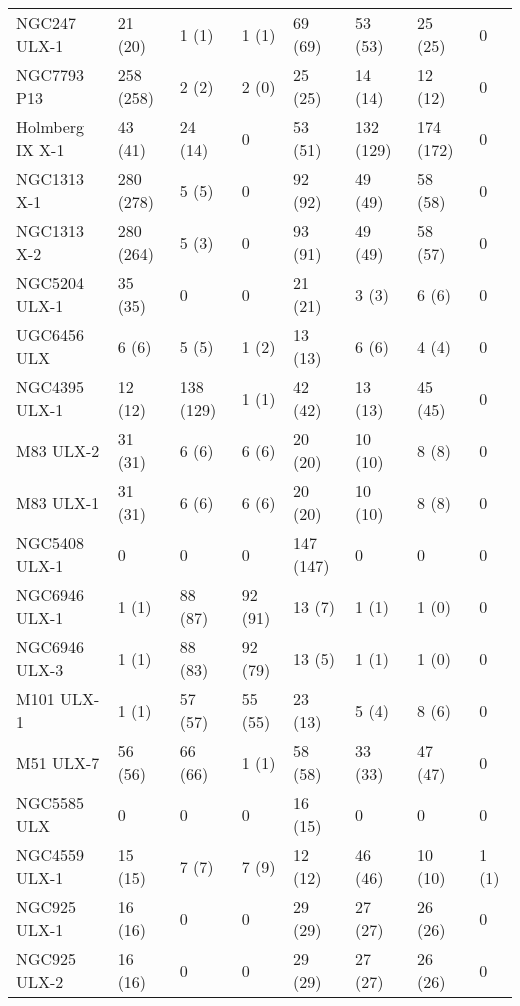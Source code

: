 \begin{tabular}{llllllll}
      NGC247 ULX-1 &   21 (20) &     1 (1) &   1 (1) &   69 (69) &   53 (53) &   25 (25) &     0 \\
       NGC7793 P13 & 258 (258) &     2 (2) &   2 (0) &   25 (25) &   14 (14) &   12 (12) &     0 \\
   Holmberg IX X-1 &   43 (41) &   24 (14) &       0 &   53 (51) & 132 (129) & 174 (172) &     0 \\
       NGC1313 X-1 & 280 (278) &     5 (5) &       0 &   92 (92) &   49 (49) &   58 (58) &     0 \\
       NGC1313 X-2 & 280 (264) &     5 (3) &       0 &   93 (91) &   49 (49) &   58 (57) &     0 \\
     NGC5204 ULX-1 &   35 (35) &         0 &       0 &   21 (21) &     3 (3) &     6 (6) &     0 \\
       UGC6456 ULX &     6 (6) &     5 (5) &   1 (2) &   13 (13) &     6 (6) &     4 (4) &     0 \\
     NGC4395 ULX-1 &   12 (12) & 138 (129) &   1 (1) &   42 (42) &   13 (13) &   45 (45) &     0 \\
         M83 ULX-2 &   31 (31) &     6 (6) &   6 (6) &   20 (20) &   10 (10) &     8 (8) &     0 \\
         M83 ULX-1 &   31 (31) &     6 (6) &   6 (6) &   20 (20) &   10 (10) &     8 (8) &     0 \\
     NGC5408 ULX-1 &         0 &         0 &       0 & 147 (147) &         0 &         0 &     0 \\
     NGC6946 ULX-1 &     1 (1) &   88 (87) & 92 (91) &    13 (7) &     1 (1) &     1 (0) &     0 \\
     NGC6946 ULX-3 &     1 (1) &   88 (83) & 92 (79) &    13 (5) &     1 (1) &     1 (0) &     0 \\
        M101 ULX-1 &     1 (1) &   57 (57) & 55 (55) &   23 (13) &     5 (4) &     8 (6) &     0 \\
         M51 ULX-7 &   56 (56) &   66 (66) &   1 (1) &   58 (58) &   33 (33) &   47 (47) &     0 \\
       NGC5585 ULX &         0 &         0 &       0 &   16 (15) &         0 &         0 &     0 \\
     NGC4559 ULX-1 &   15 (15) &     7 (7) &   7 (9) &   12 (12) &   46 (46) &   10 (10) & 1 (1) \\
      NGC925 ULX-1 &   16 (16) &         0 &       0 &   29 (29) &   27 (27) &   26 (26) &     0 \\
      NGC925 ULX-2 &   16 (16) &         0 &       0 &   29 (29) &   27 (27) &   26 (26) &     0 \\

\end{tabular}
